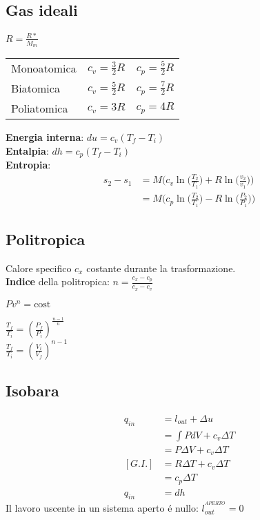 \documentclass[portrait,a4paper]{article}
\begin{document}
\begin{multicols}{3}
\subsection*{Gas ideali}
\(R=\frac {R*}{M_{m}}\) \\
\begin{tabular}{l|c|c}
	Monoatomica & $c_v=\frac{3}{2}R$ & $c_p=\frac{5}{2}R$ \\
	Biatomica & $c_v=\frac{5}{2}R$ & $c_p=\frac{7}{2}R$ \\
	Poliatomica & $c_v=3R$ & $c_p=4R$ \\
\end{tabular}
\textbf{Energia interna}: \(du = c_v(T_f-T_i)\) \\
\textbf{Entalpia}: \(dh = c_p(T_f-T_i)\) \\
\textbf{Entropia}: \begin{align*}
	s_2 - s_1 &= M\bigg( c_v \ln \bigg( \frac{T_2}{T_1} \bigg)
	+R \ln \bigg( \frac{v_2}{v_1} \bigg) \bigg) \\
	 &= M\bigg( c_p \ln \bigg( \frac{T_2}{T_1} \bigg)
	- R \ln \bigg( \frac{P_2}{P_1} \bigg) \bigg)
\end{align*}


\subsection*{Politropica}
Calore specifico \(c_x\) costante durante la trasformazione. \\
\textbf{Indice }della politropica: \(n = \frac{c_x - c_p}{c_x - c_v}\)
	\begin{center}\(Pv^n = \text{cost}\)\end{center}
	\begin{multicols}{2}
	\(\frac{T_f}{T_i} = (\frac{P_f}{P_i})^{\frac{n-1}{n}}\) \\
	\(\frac{T_f}{T_i} = (\frac{V_i}{V_f})^{n-1}\)\\
\end{multicols}


\subsection*{Isobara}
\begin{align*}
	q_{in} &= l_{out} + \Delta u \\
	&= \int PdV + c_v\Delta T \\
	&= P\Delta V + c_v\Delta T \\
	[G.I.] &= R\Delta T + c_v \Delta T \\
	&= c_p \Delta T \\
	q_{in}&= dh
\end{align*} 
Il lavoro uscente in un sistema aperto é nullo: \(l_{out}^{^{APERTO}}=0\)

\end{multicols}
\end{document}
